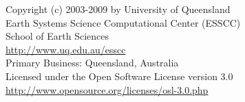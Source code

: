 
%
%
%


\begin{center}
Copyright (c) 2003-2009 by University of Queensland	\\
Earth Systems Science Computational Center (ESSCC)	\\
School of Earth Sciences \\
\url{http://www.uq.edu.au/esscc}			\\
Primary Business: Queensland, Australia			\\
Licensed under the Open Software License version 3.0	\\
\url{http://www.opensource.org/licenses/osl-3.0.php}	\\
\end{center}

